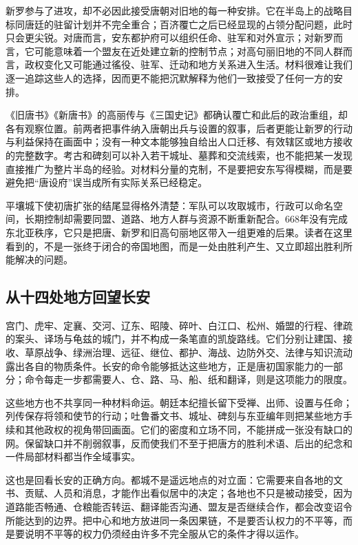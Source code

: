 新罗参与了进攻，却不必因此接受唐朝对旧地的每一种安排。它在半岛上的战略目标同唐廷的驻留计划并不完全重合；百济覆亡之后已经显现的占领分配问题，此时只会更尖锐。对唐而言，安东都护府可以组织任命、驻军和对外宣示；对新罗而言，它可能意味着一个盟友在近处建立新的控制节点；对高句丽旧地的不同人群而言，政权变化又可能通过徭役、驻军、迁动和地方关系进入生活。材料很难让我们逐一追踪这些人的选择，因而更不能把沉默解释为他们一致接受了任何一方的安排。

《旧唐书》《新唐书》的高丽传与《三国史记》都确认覆亡和此后的政治重组，却各有观察位置。前两者把事件纳入唐朝出兵与设置的叙事，后者更能让新罗的行动与利益保持在画面中；没有一种文本能够独自给出人口迁移、有效辖区或地方接收的完整数字。考古和碑刻可以补入若干城址、墓葬和交流线索，也不能把某一发现直接推广为整片半岛的经验。对材料分量的克制，不是要把安东写得模糊，而是要避免把“唐设府”误当成所有实际关系已经稳定。

平壤城下使初唐扩张的结尾显得格外清楚：军队可以攻取城市，行政可以命名空间，长期控制却需要同盟、道路、地方人群与资源不断重新配合。668年没有完成东北亚秩序，它只是把唐、新罗和旧高句丽地区带入一组更难的后果。读者在这里看到的，不是一张终于闭合的帝国地图，而是一处由胜利产生、又立即超出胜利所能解决的问题。

\subsection{从十四处地方回望长安}
宫门、虎牢、定襄、交河、辽东、昭陵、碎叶、白江口、松州、婚盟的行程、律疏的案头、译场与龟兹的城门，并不构成一条笔直的凯旋路线。它们分别让建国、接收、草原战争、绿洲治理、远征、继位、都护、海战、边防外交、法律与知识流动露出各自的物质条件。长安的命令能够抵达这些地方，正是唐初国家能力的一部分；命令每走一步都需要人、仓、路、马、船、纸和翻译，则是这项能力的限度。

这些地方也不共享同一种材料命运。朝廷本纪擅长留下受禅、出师、设置与任命；列传保存将领和使节的行动；吐鲁番文书、城址、碑刻与东亚编年则把某些地方手续和其他政权的视角带回画面。它们的密度和立场不同，不能拼成一张没有缺口的网。保留缺口并不削弱叙事，反而使我们不至于把唐方的胜利术语、后出的纪念和一件局部材料都当作全域事实。

这也是回看长安的正确方向。都城不是遥远地点的对立面：它需要来自各地的文书、贡赋、人员和消息，才能作出看似居中的决定；各地也不只是被动接受，因为道路能否畅通、仓粮能否转运、翻译能否沟通、盟友是否继续合作，都会改变诏令所能达到的边界。把中心和地方放进同一条因果链，不是要否认权力的不平等，而是要说明不平等的权力仍须经由许多不完全服从它的条件才得以运作。

